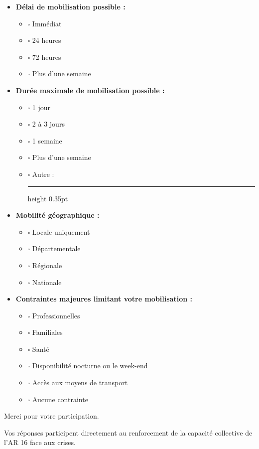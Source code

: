\documentclass[12pt,a4paper]{article}
\newcommand{\Case}{\(\square\)}
\newcommand{\Ligne}{\leavevmode\leaders\hrule height 0.35pt\hfill\kern0pt}
\begin{document}
\begin{enumerate}[label=\textbf{\arabic*.},leftmargin=0pt,itemindent=1.9em,labelwidth=1.4em,labelsep=0.5em,resume]
\begin{itemize}[leftmargin=1.5cm]
    \item \textbf{Délai de mobilisation possible :}
        \begin{itemize}[leftmargin=1.2cm]
            \item[] \Case{} Immédiat
            \item[] \Case{} 24 heures
            \item[] \Case{} 72 heures
            \item[] \Case{} Plus d'une semaine
        \end{itemize}
    \item \textbf{Durée maximale de mobilisation possible :}
        \begin{itemize}[leftmargin=1.2cm]
            \item[] \Case{} 1 jour
            \item[] \Case{} 2 à 3 jours
            \item[] \Case{} 1 semaine
            \item[] \Case{} Plus d'une semaine
            \item[] \Case{} Autre : \Ligne
        \end{itemize}
    \item \textbf{Mobilité géographique :}
        \begin{itemize}[leftmargin=1.2cm]
            \item[] \Case{} Locale uniquement
            \item[] \Case{} Départementale
            \item[] \Case{} Régionale
            \item[] \Case{} Nationale
        \end{itemize}
    \item \textbf{Contraintes majeures limitant votre mobilisation :}
        \begin{itemize}[leftmargin=1.2cm]
            \item[] \Case{} Professionnelles
            \item[] \Case{} Familiales
            \item[] \Case{} Santé
            \item[] \Case{} Disponibilité nocturne ou le week-end
            \item[] \Case{} Accès aux moyens de transport
            \item[] \Case{} Aucune contrainte
        \end{itemize}
\end{itemize}

\end{enumerate}

Merci pour votre participation.

Vos réponses participent directement au renforcement de la capacité collective de l'AR 16 face aux crises.
\end{document}
